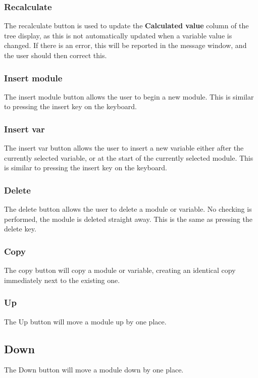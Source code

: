 \documentclass{article}
\begin{document}
\subsubsection{Recalculate}
The recalculate button is used to update the {\bf Calculated value}
column of the tree display, as this is not automatically updated when
a variable value is changed.  If there is an error, this will be
reported in the message window, and the user should then correct this.

\subsubsection{Insert module}
The insert module button allows the user to begin a new module.  This
is similar to pressing the insert key on the keyboard.

\subsubsection{Insert var}
The insert var button allows the user to insert a new variable either
after the currently selected variable, or at the start of the
currently selected module.  This is similar to pressing the insert key
on the keyboard.


\subsubsection{Delete}
\label{sect:deletebutton}
The delete button allows the user to delete a module or variable.  No
checking is performed, the module is deleted straight away.  This is
the same as pressing the delete key.

\subsubsection{Copy}
\label{sect:copybutton}
The copy button will copy a module or variable, creating an identical
copy immediately next to the existing one.

\subsubsection{Up}
The Up button will move a module up by one place.

\subsection{Down}
The Down button will move a module down by one place.
\end{document}

